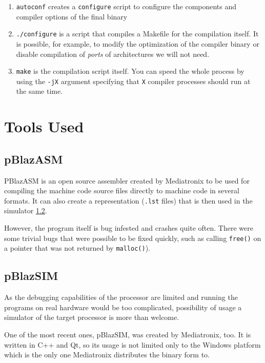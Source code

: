     \begin{enumerate}
    \item \texttt{autoconf} creates a \texttt{configure} script to configure the components and compiler options of the final binary
    \item \texttt{./configure} is a script that compiles a Makefile for the compilation itself. It is possible, for example, to modify the optimization of the compiler binary or disable compilation of \emph{ports} of architectures we will not need.
    \item \texttt{make} is the compilation script itself. You can speed the whole process by using the \texttt{-jX} argument specifying that \texttt{X} compiler processes should run at the same time.
    \end{enumerate}

    \section{Tools Used}

        \subsection{pBlazASM}\label{pblazasm}

        PBlazASM is an open source assembler created by Mediatronix to be used for compiling the machine code source files directly to machine code in several formats. It can also create a representation (\texttt{.lst} files) that is then used in the simulator \ref{pblazsim}.

        However, the program itself is bug infested and crashes quite often. There were some trivial bugs that were possible to be fixed quickly, such as calling \texttt{free()} on a pointer that was not returned by \texttt{malloc()}).

        \subsection{pBlazSIM}\label{pblazsim}

        As the debugging capabilities of the processor are limited and running the programs on real hardware would be too complicated, possibility of usage a simulator of the target processor is more than welcome.

        One of the most recent ones, pBlazSIM, was created by Mediatronix, too. It is written in C++ and Qt, so its usage is not limited only to the Windows platform which is the only one Mediatronix distributes the binary form to.

